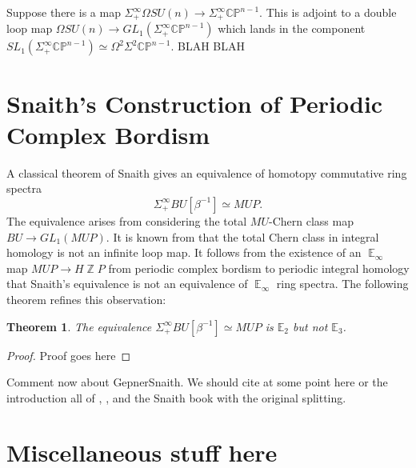 \documentclass[reqno, oneside]{amsart}
\theoremstyle{definition}
\theoremstyle{plain}
\newtheorem{thm}[nul]{Theorem}
\DeclareMathOperator{\Z}{\mathbb{Z}}
\DeclareMathOperator{\E}{\mathbb{E}}
\begin{document}
Suppose there is a map $\Sigma^{\infty}_+ \Omega SU(n) \rightarrow \Sigma^{\infty}_+ \mathbb{CP}^{n-1}$.  This is adjoint to a double loop map $\Omega SU(n) \rightarrow GL_1(\Sigma^{\infty}_+\mathbb{CP}^{n-1})$ which lands in the component $SL_1(\Sigma^{\infty}_+ \mathbb{CP}^{n-1}) \simeq \Omega^2 \Sigma^2 \mathbb{CP}^{n-1}$.  BLAH BLAH

\section{Snaith's Construction of Periodic Complex Bordism} \label{sec:SnaithSplitting}

A classical theorem of Snaith \cite{SnaithOriginal} gives an equivalence of homotopy commutative ring spectra $$\Sigma^{\infty}_+ BU [\beta^{-1}] \simeq MUP.$$  The equivalence arises from considering the total $MU$-Chern class map $BU \to GL_1(MUP).$  It is known from \cite{SnaithNotMultiplicative} that the total Chern class in integral homology is not an infinite loop map.  It follows from the existence of an $\E_\infty$ map $MUP \to H\Z P$ from periodic complex bordism to periodic integral homology that Snaith's equivalence is not an equivalence of $\E_\infty$ ring spectra.  The following theorem refines this observation:



\begin{thm}
The equivalence $\Sigma^{\infty}_+ BU [\beta^{-1}] \simeq MUP$ is $\mathbb{E}_2$ but not $\mathbb{E}_3$.
\end{thm}

\begin{proof}
Proof goes here
\end{proof}

Comment now about GepnerSnaith.
We should cite at some point here or the introduction all of \cite{SnaithNotMultiplicative},  \cite{GepnerSnaith}, and the Snaith book with the original splitting.

\section{Miscellaneous stuff here}
\end{document}
